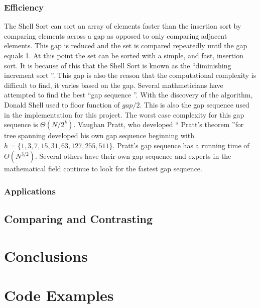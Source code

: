 \documentclass{article}
\begin{document}
    \subsubsection{Efficiency}
        The Shell Sort can sort an array of elements faster than the insertion
        sort by comparing elements across a gap as opposed to only comparing
        adjacent elements. This gap is reduced and the set is compared
        repeatedly until the gap equals 1. At this point the set can be sorted
        with a simple, and fast, insertion sort. It is because of this that the
        Shell Sort is known as the \textquotedblleft diminishing increment sort
        \textquotedblright \cite{education}. This gap is also the reason that
        the computational complexity is difficult to find, it varies based on
        the gap. Several mathmeticians have attempted to find the best
        \textquotedblleft gap sequence \textquotedblright. With the discovery
        of the algorithm, Donald Shell used to floor function of $gap / 2$.
        This is also the gap sequence used in the implementation for this
        project. The worst case complexity for this gap sequence is
        $\Theta (N/2^k)$. Vaughan Pratt, who developed \textquotedblleft
        Pratt's theorem \textquotedblright for tree spanning developed his own
        gap sequence beginning with $h= \{ 1, 3, 7, 15, 31, 63, 127, 255, 511
        \}$. Pratt's gap sequence has a running time of $\Theta (N^{3/2})$.
        Several others have their own gap sequence and experts in the
        mathematical field continue to look for the fastest gap
        sequence\cite{princton}.\\
    \subsubsection{Applications}
        
        
   \subsection{Comparing and Contrasting}
\section{Conclusions}

\appendix
\section{Code Examples}





\end{document}
